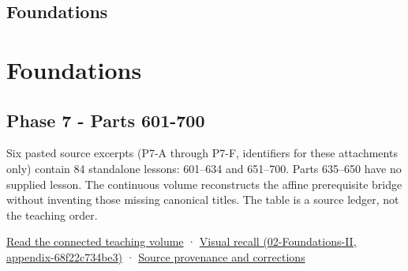 \hypertarget{appendix-fd090d982a15}{}
\section*{Foundations}
\chapter{Foundations}\label{appendix-fd090d982a15-foundations}

\section{Phase 7 - Parts 601-700}\label{appendix-fd090d982a15-phase-7---parts-601-700}

Six pasted source excerpts (P7-A through P7-F, identifiers for these attachments only) contain 84 standalone lessons: 601--634 and 651--700. Parts 635--650 have no supplied lesson. The continuous volume reconstructs the affine prerequisite bridge without inventing those missing canonical titles. The table is a source ledger, not the teaching order.

\href{Continuous\%20Notes/Computing\%20Foundations\%20-\%20From\%20Bits\%20to\%20C++\%20and\%20Systems\%20APIs\#Keep\%20the\%20promises\%20visible\%20while\%20moving\%20between\%20representations}{Read the connected teaching volume} · \href{../02-Foundations-II/main.pdf\#nameddest=appendix-68f22c734be3}{Visual recall (02-Foundations-II, appendix-68f22c734be3)} · \hyperref[appendix-a103e7846d21-phase-7---source-analysis-and-verification]{Source provenance and corrections}

